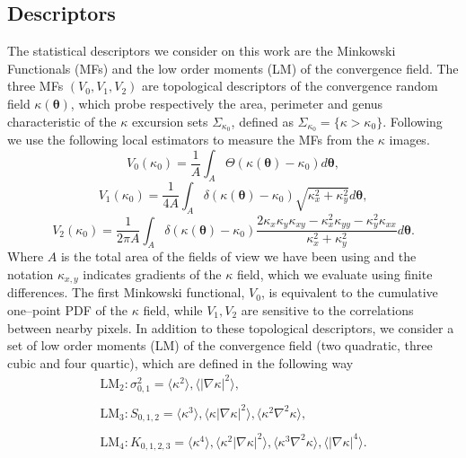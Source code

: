 \documentclass[reprint,aps,prd,superscriptaddress,showkeys]{revtex4-1}
\begin{document}
\subsection{Descriptors}
The statistical descriptors we consider on this work are the Minkowski Functionals (MFs) and the low order moments (LM) of the convergence field. The three MFs $(V_0,V_1,V_2)$ are topological descriptors of the convergence random field $\kappa(\pmb{\theta})$, which probe respectively the area, perimeter and genus characteristic of the $\kappa$ excursion sets $\Sigma_{\kappa_0}$, defined as $\Sigma_{\kappa_0}=\{\kappa>\kappa_0\}$. Following \citep{Petri2013,MinkJan} we use the following local estimators to measure the MFs from the $\kappa$ images. 
%
\begin{equation*}
\label{v0meas}
V_0(\kappa_0)=\frac{1}{A}\int_A\Theta(\kappa(\pmb{\theta})-\kappa_0)d\pmb{\theta},
\end{equation*}
\begin{equation}
\label{v1meas}
V_1(\kappa_0)=\frac{1}{4A}\int_A\delta(\kappa(\pmb{\theta})-\kappa_0)\sqrt{\kappa_x^2+\kappa_y^2}d\pmb{\theta},
\end{equation}
\begin{equation*}
\label{v2meas}
V_2(\kappa_0)=\frac{1}{2\pi A}\int_A\delta(\kappa(\pmb{\theta})-\kappa_0)\frac{2\kappa_x\kappa_y\kappa_{xy}-\kappa_x^2\kappa_{yy}-\kappa_y^2\kappa_{xx}}{\kappa_x^2+\kappa_y^2}d\pmb{\theta}.
\end{equation*}
%
Where $A$ is the total area of the fields of view we have been using and the notation $\kappa_{x,y}$ indicates gradients of the $\kappa$ field, which we evaluate using finite differences. The first Minkowski functional, $V_0$, is equivalent to the cumulative one--point PDF of the $\kappa$ field, while $V_1,V_2$ are sensitive to the correlations between nearby pixels. In addition to these topological descriptors, we consider a set of low order moments (LM) of the convergence field (two quadratic, three cubic and four quartic), which are defined in the following way
%
\begin{equation}
\begin{matrix}
\mathrm{LM_2}: \sigma_{0,1}^2 = \langle\kappa^2\rangle,\langle\vert\nabla\kappa\vert^2\rangle, \\ \\
\mathrm{LM_3}: S_{0,1,2} = \langle\kappa^3\rangle,\langle\kappa\vert\nabla\kappa\vert^2\rangle,\langle\kappa^2\nabla^2\kappa\rangle, \\ \\
\mathrm{LM_4}: K_{0,1,2,3} = \langle\kappa^4\rangle,\langle\kappa^2\vert\nabla\kappa\vert^2\rangle,\langle\kappa^3\nabla^2\kappa\rangle,\langle\vert\nabla\kappa\vert^4\rangle.
\end{matrix}
\end{equation}
\end{document}
